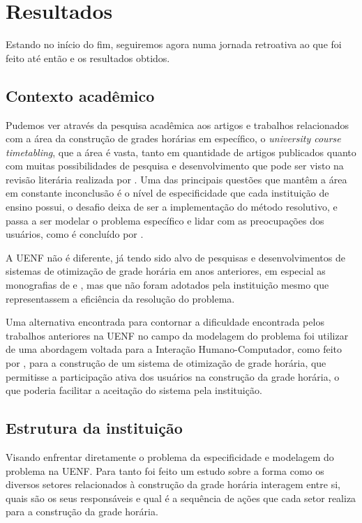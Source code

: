 \chapter{Resultados} \label{chap:resultados} %

Estando no início do fim, seguiremos agora numa jornada retroativa ao que foi feito até então e os resultados obtidos.

\section{Contexto acadêmico} %

Pudemos ver através da pesquisa acadêmica aos artigos e trabalhos relacionados com a área da construção de grades horárias em específico, o \textit{university course timetabling}, que a área é vasta, tanto em quantidade de artigos publicados quanto com muitas possibilidades de pesquisa e desenvolvimento que pode ser visto na revisão literária realizada por . Uma das principais questões que mantêm a área em constante inconclusão é o nível de especificidade que cada instituição de ensino possui, o desafio deixa de ser a implementação do método resolutivo, e passa a ser modelar o problema específico e lidar com as preocupações dos usuários, como é concluído por .

A UENF não é diferente, já tendo sido alvo de pesquisas e desenvolvimentos de sistemas de otimização de grade horária em anos anteriores, em especial as monografias de  e , mas que não foram adotados pela instituição mesmo que representassem a eficiência da resolução do problema.

Uma alternativa encontrada para contornar a dificuldade encontrada pelos trabalhos anteriores na UENF no campo da modelagem do problema foi utilizar de uma abordagem voltada para a Interação Humano-Computador, como feito por , para a construção de um sistema de otimização de grade horária, que permitisse a participação ativa dos usuários na construção da grade horária, o que poderia facilitar a aceitação do sistema pela instituição.

\section{Estrutura da instituição}

Visando enfrentar diretamente o problema da especificidade e modelagem do problema na UENF. Para tanto foi feito um estudo sobre a forma como os diversos setores relacionados à construção da grade horária interagem entre si, quais são os seus responsáveis e qual é a sequência de ações que cada setor realiza para a construção da grade horária.

